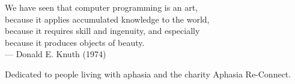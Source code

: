 
\clearpage

\vspace*{5cm}

\begin{center}
   
    We have seen that computer programming is an art, \\ 
    because it applies accumulated knowledge to the world, \\ 
    because it requires skill and ingenuity, and especially \\
    because it produces objects of beauty.\\
    
    \medskip
    --- Donald E. Knuth (1974)~\cite{knuth:1974}


\vspace{2cm}

    Dedicated to people living with aphasia and the charity Aphasia Re-Connect. \\ 

\end{center}

